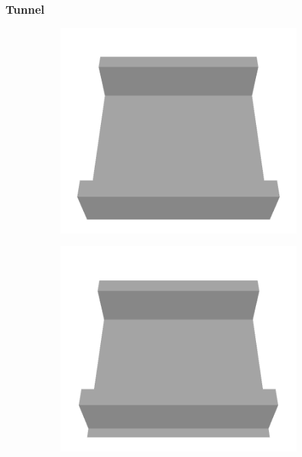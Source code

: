 \subsubsection{Tunnel}

\begin{figure}[H]
    \centering
    \begin{subfigure}[b]{0.24\textwidth}
    \includegraphics[width=\linewidth]{../img/5/custom_patches/tunnel/all/00-3d.png}
    \end{subfigure}
    \begin{subfigure}[b]{0.24\textwidth}
    \includegraphics[width=\linewidth]{../img/5/custom_patches/tunnel/all/04-3d.png}

\end{subfigure}
\end{figure}
